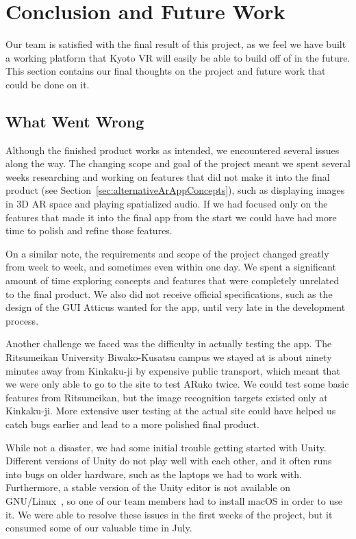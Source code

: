 \documentclass[a4paper, 10pt, american, titlepage]{article}
\begin{document}
\section{Conclusion and Future Work}
\label{sec:conclusionAndFutureWork}

Our team is satisfied with the final result of this project, as we feel we have
built a working platform that Kyoto VR will easily be able to build off of in
the future. This section contains our final thoughts on the project and future
work that could be done on it.

\subsection{What Went Wrong}
\label{sec:whatWentWrong}

Although the finished product works as intended, we encountered several issues
along the way. The changing scope and goal of the project meant we spent
several weeks researching and working on features that did not make it into the
final product (see Section~\ref{sec:alternativeArAppConcepts}), such as
displaying images in 3D AR space and playing spatialized audio. If we had
focused only on the features that made it into the final app from the start we
could have had more time to polish and refine those features.

On a similar note, the requirements and scope of the project changed greatly
from week to week, and sometimes even within one day. We spent a significant
amount of time exploring concepts and features that were completely unrelated to
the final product. We also did not receive official specifications, such as the
design of the GUI Atticus wanted for the app, until very late in the development
process.

Another challenge we faced was the difficulty in actually testing the app. The
Ritsumeikan University Biwako-Kusatsu campus we stayed at is about ninety
minutes away from Kinkaku-ji by expensive public transport, which meant that we
were only able to go to the site to test ARuko twice. We could test some basic
features from Ritsumeikan, but the image recognition targets existed only at
Kinkaku-ji. More extensive user testing at the actual site could have helped us
catch bugs earlier and lead to a more polished final product.

While not a disaster, we had some initial trouble getting started with Unity.
Different versions of Unity do not play well with each other, and it often runs
into bugs on older hardware, such as the laptops we had to work with.
Furthermore, a stable version of the Unity editor is not available on
GNU/Linux~\autocite{best2019}, so one of our team members had to install macOS
in order to use it. We were able to resolve these issues in the first weeks of
the project, but it consumed some of our valuable time in July.
\end{document}

